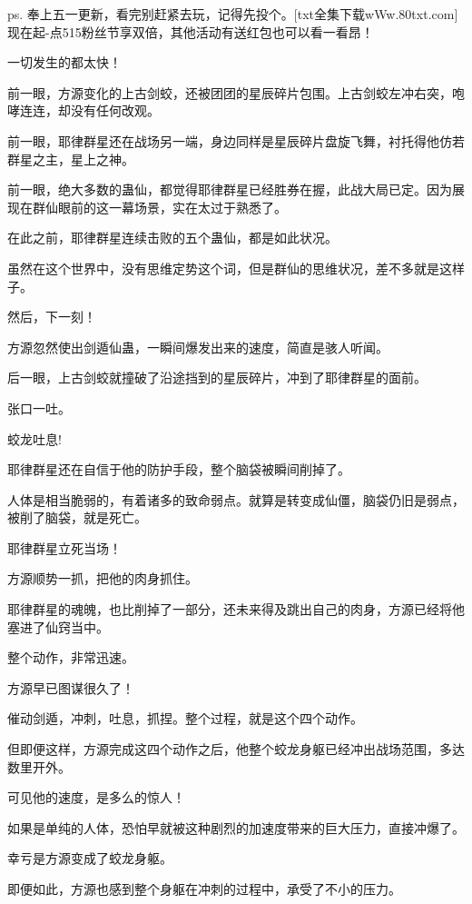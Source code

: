 
\begin{this_body}

ps. 奉上五一更新，看完别赶紧去玩，记得先投个。[txt全集下载wWw.80txt.com]现在起-点515粉丝节享双倍，其他活动有送红包也可以看一看昂！

一切发生的都太快！

前一眼，方源变化的上古剑蛟，还被团团的星辰碎片包围。上古剑蛟左冲右突，咆哮连连，却没有任何改观。

前一眼，耶律群星还在战场另一端，身边同样是星辰碎片盘旋飞舞，衬托得他仿若群星之主，星上之神。

前一眼，绝大多数的蛊仙，都觉得耶律群星已经胜券在握，此战大局已定。因为展现在群仙眼前的这一幕场景，实在太过于熟悉了。

在此之前，耶律群星连续击败的五个蛊仙，都是如此状况。

虽然在这个世界中，没有思维定势这个词，但是群仙的思维状况，差不多就是这样子。

然后，下一刻！

方源忽然使出剑遁仙蛊，一瞬间爆发出来的速度，简直是骇人听闻。

后一眼，上古剑蛟就撞破了沿途挡到的星辰碎片，冲到了耶律群星的面前。

张口一吐。

蛟龙吐息!

耶律群星还在自信于他的防护手段，整个脑袋被瞬间削掉了。

人体是相当脆弱的，有着诸多的致命弱点。就算是转变成仙僵，脑袋仍旧是弱点，被削了脑袋，就是死亡。

耶律群星立死当场！

方源顺势一抓，把他的肉身抓住。

耶律群星的魂魄，也比削掉了一部分，还未来得及跳出自己的肉身，方源已经将他塞进了仙窍当中。

整个动作，非常迅速。

方源早已图谋很久了！

催动剑遁，冲刺，吐息，抓捏。整个过程，就是这个四个动作。

但即便这样，方源完成这四个动作之后，他整个蛟龙身躯已经冲出战场范围，多达数里开外。

可见他的速度，是多么的惊人！

如果是单纯的人体，恐怕早就被这种剧烈的加速度带来的巨大压力，直接冲爆了。

幸亏是方源变成了蛟龙身躯。

即便如此，方源也感到整个身躯在冲刺的过程中，承受了不小的压力。


\end{this_body}
